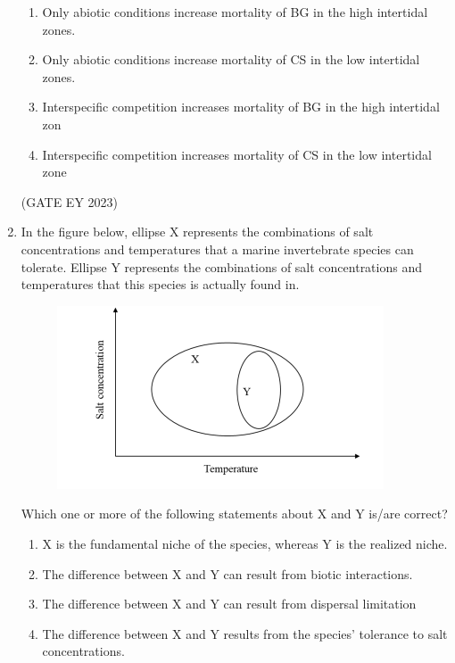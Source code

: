 \documentclass[journal,12pt,onecolumn]{IEEEtran}
\theoremstyle{remark}
\begin{document}
\begin{enumerate}
\begin{enumerate}

\item Only abiotic conditions increase mortality of BG in the high intertidal zones.
\item Only abiotic conditions increase mortality of CS in the low intertidal zones.
\item Interspecific competition increases mortality of BG in the high intertidal zon
\item Interspecific competition increases mortality of CS in the low intertidal zone


\end{enumerate}


\hfill{(GATE EY 2023)}


 \item 
 In the figure below, ellipse X represents the combinations of salt concentrations
and temperatures that a marine invertebrate species can tolerate. Ellipse Y
represents the combinations of salt concentrations and temperatures that this
species is actually found in.
\begin{figure}[H]
    \centering
    \includegraphics[]{figs/Q.57.png}
    \caption{}
    \label{fig:11}
\end{figure}
Which one or more of the following statements about X and Y is/are correct?
\begin{enumerate}

\item X is the fundamental niche of the species, whereas Y is the realized niche.
\item The difference between X and Y can result from biotic interactions.
\item The difference between X and Y can result from dispersal limitation
\item The difference between X and Y results from the species' tolerance to salt
concentrations.


\end{enumerate}


\end{enumerate}
\end{document}
